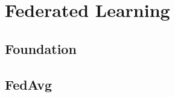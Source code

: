 \chapter{Federated Learning}
\label{ch:Federated_Learning}

\section{Foundation}
\lipsum[1-3]  %
\cite{li2020}

\section{FedAvg}
\lipsum[4-6]  %